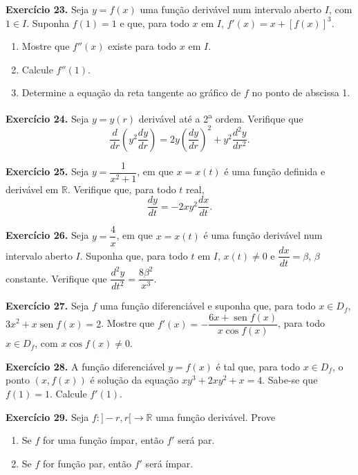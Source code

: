 \documentclass[12pt,a4paper]{article}
\begin{document}
\vspace{0.5cm}
\noindent\textbf{Exercício 23.}
Seja $y = f(x)$ uma função derivável num intervalo aberto $I$, com $1 \in I$. Suponha $f(1) = 1$ e que, para todo $x$ em $I$, $f'(x) = x + [f(x)]^3$.
\begin{enumerate}
    \renewcommand{\theenumi}{\alph{enumi}}
    \renewcommand{\labelenumi}{\theenumi)}
    \item Mostre que $f''(x)$ existe para todo $x$ em $I$.
    \item Calcule $f''(1)$.
    \item Determine a equação da reta tangente ao gráfico de $f$ no ponto de abscissa 1.
\end{enumerate}

\vspace{0.5cm}
\noindent\textbf{Exercício 24.}
Seja $y = y(r)$ derivável até a 2\textsuperscript{a} ordem. Verifique que
\[
\dfrac{d}{dr}\!\left(y^2 \dfrac{dy}{dr}\right) = 2y\!\left(\dfrac{dy}{dr}\right)^{\!2} + y^2 \dfrac{d^2 y}{dr^2}.
\]

\vspace{0.5cm}
\noindent\textbf{Exercício 25.}
Seja $y = \dfrac{1}{x^2 + 1}$, em que $x = x(t)$ é uma função definida e derivável em $\mathbb{R}$. Verifique que, para todo $t$ real,
\[
\dfrac{dy}{dt} = -2xy^2 \dfrac{dx}{dt}.
\]

\vspace{0.5cm}
\noindent\textbf{Exercício 26.}
Seja $y = \dfrac{4}{x}$, em que $x = x(t)$ é uma função derivável num intervalo aberto $I$. Suponha que, para todo $t$ em $I$, $x(t) \neq 0$ e $\dfrac{dx}{dt} = \beta$, $\beta$ constante. Verifique que $\dfrac{d^2 y}{dt^2} = \dfrac{8\beta^2}{x^3}$.

\vspace{0.5cm}
\noindent\textbf{Exercício 27.}
Seja $f$ uma função diferenciável e suponha que, para todo $x \in D_f$, $3x^2 + x\operatorname{sen} f(x) = 2$. Mostre que $f'(x) = -\dfrac{6x + \operatorname{sen} f(x)}{x\cos f(x)}$, para todo $x \in D_f$, com $x\cos f(x) \neq 0$.

\vspace{0.5cm}
\noindent\textbf{Exercício 28.}
A função diferenciável $y = f(x)$ é tal que, para todo $x \in D_f$, o ponto $(x, f(x))$ é solução da equação $xy^3 + 2xy^2 + x = 4$. Sabe-se que $f(1) = 1$. Calcule $f'(1)$.

\vspace{0.5cm}
\noindent\textbf{Exercício 29.} Seja $f\colon {]-r, r[} \to \mathbb{R}$ uma função derivável. Prove
\begin{enumerate}
    \renewcommand{\theenumi}{\alph{enumi}}
    \renewcommand{\labelenumi}{\theenumi)}
    \item Se $f$ for uma função ímpar, então $f'$ será par.
    \item Se $f$ for função par, então $f'$ será ímpar.
\end{enumerate}
\end{document}
